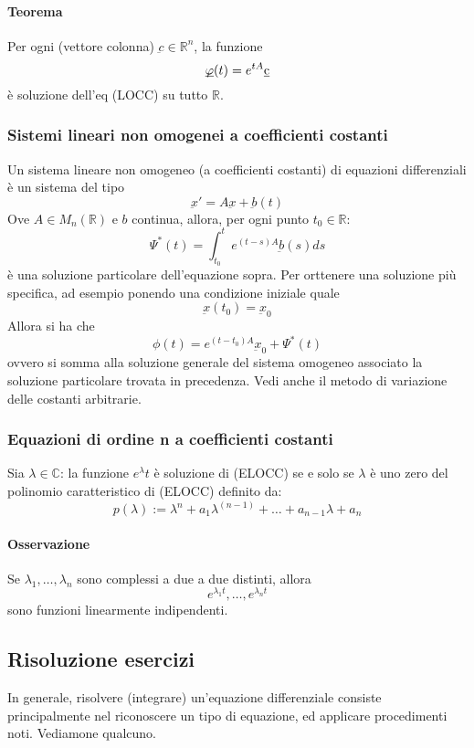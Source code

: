 \documentclass[a4paper,12pt]{article}
\begin{document}
\paragraph{Teorema} Per ogni (vettore colonna) $\underbar{c} \in \mathbb{R}^n $, la funzione $$ \underbar{$\varphi$}(t) = e^{tA} \underbar{c} $$è soluzione dell'eq (LOCC) su tutto $\mathbb{R}$.

\subsubsection{Sistemi lineari non omogenei a coefficienti costanti}
Un sistema lineare non omogeneo (a coefficienti costanti) di equazioni differenziali è un sistema del tipo
$$\underbar{x}'=A\underbar{x}+\underbar{b}(t)$$
Ove $A\in M_n(\mathbb{R})$ e $b$ continua, allora, per ogni punto $t_0 \in \mathbb{R}$:
$$\Psi^*(t)= \int_{t_0}^t e^{(t-s)A} \underbar{b}(s)ds$$
è una soluzione particolare dell'equazione sopra.
Per orttenere una soluzione più specifica, ad esempio ponendo una condizione iniziale quale
$$\underbar{x}(t_0)=\underbar{x}_0$$
Allora si ha che
$$\phi(t)=e^{(t-t_0)A}\underbar{x}_0+\Psi^*(t)$$
ovvero si somma alla soluzione generale del sistema omogeneo associato la soluzione particolare trovata in precedenza.
Vedi anche il metodo di variazione delle costanti arbitrarie.

\subsubsection{Equazioni di ordine n a coefficienti costanti}
Sia $\lambda \in \mathbb{C}$: la funzione $e^\lambda t$ è soluzione di (ELOCC) se e solo se $\lambda$ è uno zero del polinomio caratteristico di (ELOCC) definito da: $$ p(\lambda) := \lambda^n + a_1\lambda^{(n-1)}+ \dots +a_{n-1}\lambda+a_n$$
\paragraph*{Osservazione}
Se  $\lambda_1,\dots,\lambda_n$ sono complessi a due a due distinti, allora 
$$ e^{\lambda_1 t}, \dots ,e^{\lambda_n t}$$ sono funzioni linearmente indipendenti. 



\subsection{Risoluzione esercizi}
In generale, risolvere (integrare) un'equazione differenziale consiste principalmente nel riconoscere un tipo di equazione, ed applicare procedimenti noti. Vediamone qualcuno.
\end{document}
